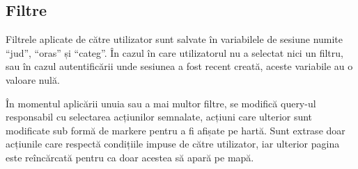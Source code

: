\documentclass[12pt,a4paper]{report}
\begin{document}
\subsection{Filtre}
\par
Filtrele aplicate de către utilizator sunt salvate în variabilele de sesiune numite “jud”, “oras” și “categ”. În cazul în care utilizatorul nu a selectat nici un filtru, sau în cazul autentificării unde sesiunea a fost recent creată, aceste variabile au o valoare nulă.
\\
\par
În momentul aplicării unuia sau a mai multor filtre, se modifică query-ul responsabil cu selectarea acțiunilor semnalate, acțiuni care ulterior sunt modificate sub formă de markere pentru a fi afișate pe hartă. Sunt extrase doar acțiunile care respectă condițiile impuse de către utilizator, iar ulterior pagina este reîncărcată pentru ca doar acestea să apară pe mapă.
\\
\end{document}
